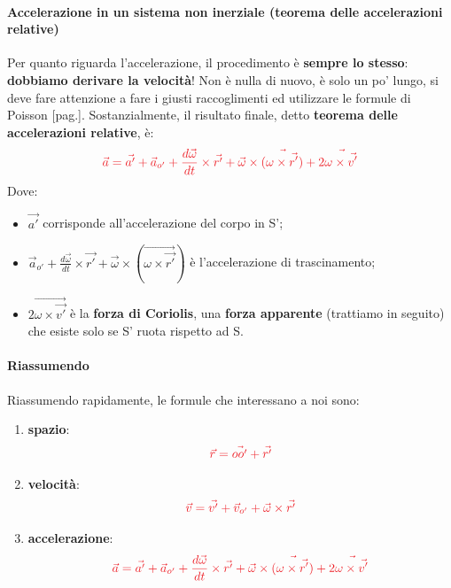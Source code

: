             \paragraph{Accelerazione in un sistema non inerziale (teorema delle accelerazioni relative)}
                Per quanto riguarda l'accelerazione, il procedimento è \textbf{sempre lo stesso}: \textbf{dobbiamo derivare la velocità}! Non è nulla di nuovo, è solo un po' lungo, si deve fare attenzione a fare i giusti raccoglimenti ed utilizzare le formule di Poisson [pag.\pageref{Poisson}]. Sostanzialmente, il risultato finale, detto \textbf{teorema delle accelerazioni relative}, è:
                \begin{align*}
                    \textcolor{Red}{\vec{a} = \vec{a'} + \vec{a}_{o'}+\frac{d\vec{\omega}}{dt}\times \vec{r'}+\vec{\omega}\times(\vec{\omega\times\vec{r'}})+2\vec{\omega\times\vec{v'}}}
                \end{align*}
                Dove:
                \begin{itemize}
                    \item $\vec{a'}$ corrisponde all'accelerazione del corpo in S';
                    \item $\vec{a}_{o'}+\frac{d\vec{\omega}}{dt}\times \vec{r'}+\vec{\omega}\times(\vec{\omega\times\vec{r'}})$ è l'accelerazione di trascinamento;
                    \item $2\vec{\omega\times\vec{v'}}$ è la \textbf{forza di Coriolis}, una \textbf{forza apparente} (trattiamo in seguito) che esiste solo se S' ruota rispetto ad S.
                \end{itemize}


            \paragraph{Riassumendo}
                Riassumendo rapidamente, le formule che interessano a noi sono:
                \begin{enumerate}
                    \item \textbf{spazio}:
                        \begin{align*}
                            \textcolor{Red}{\vec{r}=\vec{oo'}+\vec{r'}}
                        \end{align*}
                    \item \textbf{velocità}:
                        \begin{align*}
                            \textcolor{Red}{\vec{v}=\vec{v'} + \vec{v}_{o'} + \vec{\omega}\times\vec{r'}}
                        \end{align*}
                    \item \textbf{accelerazione}:
                        \begin{align*}
                            \textcolor{Red}{\vec{a} = \vec{a'} + \vec{a}_{o'}+\frac{d\vec{\omega}}{dt}\times \vec{r'}+\vec{\omega}\times(\vec{\omega\times\vec{r'}})+2\vec{\omega\times\vec{v'}}}
                        \end{align*}
                \end{enumerate}
